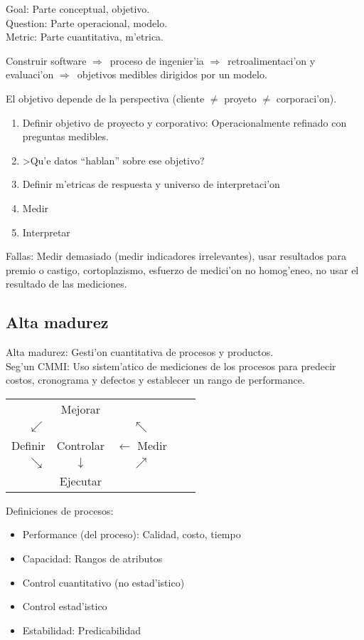 \documentclass[a4paper,spanish]{article}
\newcommand{\tab}[0]{\hspace*{0.5cm}}
\newcommand{\then}[0]{\ensuremath{\Rightarrow}~}
\newenvironment{items}{
		\vspace*{-\topsep}
		\begin{itemize} 
		\addtolength{\itemsep}{-0.5\baselineskip}
		}{\end{itemize}\vspace*{-\topsep}}
\newenvironment{numbers}{
		\vspace*{-\topsep}
		\begin{enumerate} 
		\addtolength{\itemsep}{-0.5\baselineskip}
		}{\end{enumerate}\vspace*{-\topsep}}
\begin{document}
Goal: Parte conceptual, objetivo. \\
Question: Parte operacional, modelo. \\
Metric: Parte cuantitativa, m'etrica.

Construir software \then proceso de ingenier'ia \then retroalimentaci'on y
	evaluaci'on \then objetivos medibles dirigidos por un modelo.
	
El objetivo depende de la perspectiva (cliente $\neq$ proyeto $\neq$ 
	corporaci'on).
	
\begin{numbers}
\item Definir objetivo de proyecto y corporativo: Operacionalmente refinado
	con preguntas medibles.
\item >Qu'e datos ``hablan'' sobre ese objetivo?
\item Definir m'etricas de respuesta y universo de interpretaci'on
\item Medir
\item Interpretar
\end{numbers}

Fallas: Medir demasiado (medir indicadores irrelevantes), usar resultados para
	premio o castigo, cortoplazismo, esfuerzo de medici'on no homog'eneo,
	no usar el resultado de las mediciones.
	
\subsection{Alta madurez}

Alta madurez: Gesti'on cuantitativa de procesos y productos. \\
\tab Seg'un CMMI: Uso sistem'atico de mediciones de los procesos para predecir
	costos, cronograma y defectos y establecer un rango de performance.
	
\begin{tabular}{rcccl}
& Mejorar & \\
$\swarrow$ & & $\nwarrow$ \\
Definir & Controlar & $\longleftarrow$ Medir \\
$\searrow$ & $\downarrow$ & $\nearrow$ \\
& Ejecutar &
\end{tabular}

Definiciones de procesos:
\begin{items}
\item Performance (del proceso): Calidad, costo, tiempo
\item Capacidad: Rangos de atributos
\item Control cuantitativo (no estad'istico)
\item Control estad'istico
\item Estabilidad: Predicabilidad
\end{items}
\end{document}
